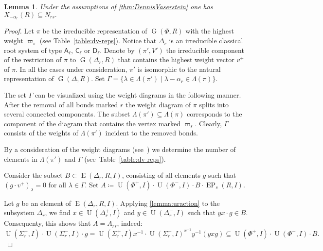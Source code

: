 \documentclass[oneside, 12pt]{amsart}
\theoremstyle{plain}
\numberwithin{equation}{section}
\newtheorem{lemma}{Lemma}
\numberwithin{lemma}{section}
\theoremstyle{definition}
\theoremstyle{remark}
\DeclareMathOperator{\G}{G}
\DeclareMathOperator{\E}{E}
\DeclareMathOperator{\EP}{EP}
\DeclareMathOperator{\U}{U}
\newcommand{\rA}{\mathsf{A}}
\newcommand{\rC}{\mathsf{C}}
\newcommand{\rD}{\mathsf{D}}
\begin{document}
\begin{lemma}\label{lemma:Stein_reduction}
Under the assumptions of \cref{thm:DennisVaserstein} one has $X_{-\alpha_r}(R) \subseteq N_{rs}.$
\end{lemma}
\begin{proof}
Let $\pi$ be the irreducible representation of $\G(\Phi, R)$ with the highest weight $\varpi_s$ (see Table~\ref{table:dv-reps}).
Notice that $\Delta_r$ is an irreducible classical root system of type $\rA_\ell$, $\rC_\ell$ or $\rD_\ell$.
Denote by $(\pi', V')$ the irreducible component of the restriction of $\pi$ to $\G(\Delta_r, R)$ that contains the highest weight vector $v^+$ of $\pi$.
In all the cases under consideration, $\pi'$ is isomorphic to the natural representation of $\G(\Delta, R)$.
Set $\Gamma = \{\lambda \in \Lambda(\pi') \mid \lambda - \alpha_r \in \Lambda(\pi) \}.$

The set $\Gamma$ can be visualized using the weight diagrams in the following manner.
After the removal of all bonds marked $r$ the weight diagram of $\pi$ splits into several connected components.
The subset $\Lambda(\pi') \subseteq \Lambda(\pi)$ corresponds to the component of the diagram that contains the vertex marked $\varpi_s$.
Clearly, $\Gamma$ consists of the weights of $\Lambda(\pi')$ incident to the removed bonds.

By a consideration of the weight diagrams (see~\cite{PSV98}) we determine the number of elements in $\Lambda(\pi')$ and $\Gamma$ (see~Table~\ref{table:dv-reps}).

Consider the subset $B \subset \E(\Delta_r, R, I)$, consisting of all elements $g$ such that $(g \cdot v^+)_\lambda = 0$ for all $\lambda\in\Gamma$.
Set $A\coloneqq\U(\Phi^+, I)\cdot \U(\Phi^-, I) \cdot B \cdot \EP_s(R, I).$

Let $g$ be an element of $\E(\Delta_r, R, I)$. Applying \cref{lemma:uraction} to the subsystem $\Delta_r$, we find
$x\in\U(\Delta_r^+, I)$ and $y\in \U(\Delta_r^-, I)$ such that $yx\cdot g \in B$.
Consequenty, this shows that $A = A_{rs}$, indeed:
\begin{equation*} \U(\Sigma^+_r, I) \cdot \U(\Sigma^-_r, I) \cdot g = \U(\Sigma^+_r, I) x^{-1} \cdot \U(\Sigma^-_r, I)^{x^{-1}} y^{-1} (yxg) \subseteq \U(\Phi^+, I) \cdot \U(\Phi^-, I) \cdot B. \end{equation*}


\end{proof}
\end{document}
